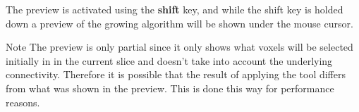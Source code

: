 The preview is activated using the \textbf{shift} key, and while the shift key is
holded down a preview of the growing algorithm will be shown under the mouse cursor.\\

\begin{bclogo}[couleur = yellow!33, logo=\bcattention]
{Note} The preview is only partial since it only shows what voxels will be selected
initially in in the current slice and doesn't take into account the underlying connectivity.
Therefore it is possible that the result of applying the tool differs from what was shown
in the preview. This is done this way for performance reasons.
\end{bclogo}\\


